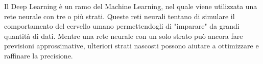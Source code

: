 Il Deep Learning è un ramo del Machine Learning, nel quale viene utilizzata una rete neurale con tre o più strati. Queste reti neurali tentano di simulare il comportamento del cervello umano permettendogli di "imparare" da grandi quantità di dati. Mentre una rete neurale con un solo strato può ancora fare previsioni approssimative, ulteriori strati nascosti possono aiutare a ottimizzare e raffinare la precisione.